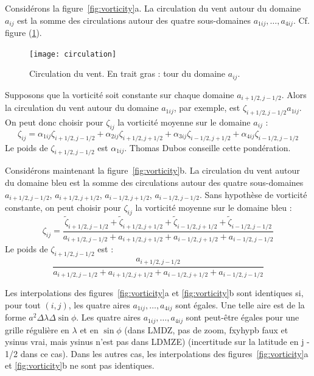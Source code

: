 \documentclass[a4paper,english,french]{article}
\begin{document}
Considérons la figure~\ref{fig:vorticity}a. La circulation du vent
autour du domaine $a_{ij}$ est la somme des circulations autour des
quatre sous-domaines $a_{1ij}, \dots, a_{4ij}$. Cf. figure
(\ref{fig:circulation}).
\begin{figure}
  \centering
  \texttt{[image: circulation]}
  \caption{Circulation du vent. En trait gras : tour du domaine
    $a_{ij}$.}
  \label{fig:circulation}
\end{figure}
Supposons que la vorticité soit constante sur chaque domaine
$a_{i+1/2, j-1/2}$. Alors la circulation du vent autour du domaine
$a_{1ij}$, par exemple, est $\zeta_{i+1/2,j-1/2} a_{1ij}$. On peut
donc choisir pour $\zeta_{ij}$ la vorticité moyenne sur le domaine
$a_{ij}$ :
\begin{equation*}
  \zeta_{ij} = \alpha_{1ij} \zeta_{i+1/2,j-1/2}
  + \alpha_{2ij} \zeta_{i+1/2,j+1/2}
  + \alpha_{3ij} \zeta_{i-1/2,j+1/2} + \alpha_{4ij} \zeta_{i-1/2,j-1/2} 
\end{equation*}
Le poids de $\zeta_{i+1/2,j-1/2}$ est $\alpha_{1ij}$. Thomas Dubos
conseille cette pondération.

Considérons maintenant la figure~\ref{fig:vorticity}b. La circulation
du vent autour du domaine bleu est la somme des circulations autour
des quatre sous-domaines $a_{i+1/2,j-1/2}$, $a_{i+1/2,j+1/2}$,
$a_{i-1/2,j+1/2}$, $a_{i-1/2,j-1/2}$. Sans hypothèse de vorticité
constante, on peut choisir pour $\zeta_{ij}$ la vorticité moyenne sur
le domaine bleu :
\begin{equation*}
  \zeta_{ij}
  = \frac{
    \tilde \zeta_{i+1/2, j-1/2} + \tilde \zeta_{i+1/2, j+1/2}
    + \tilde \zeta_{i-1/2, j+1/2} + \tilde \zeta_{i-1/2, j-1/2}
  }
  {a_{i+1/2, j-1/2} + a_{i+1/2, j+1/2} + a_{i-1/2, j+1/2} + a_{i-1/2, j-1/2}}
\end{equation*}
Le poids de $\zeta_{i+1/2,j-1/2}$ est :
\begin{equation*}
  \frac{a_{i+1/2, j-1/2}}
  {a_{i+1/2, j-1/2} + a_{i+1/2, j+1/2} + a_{i-1/2, j+1/2} + a_{i-1/2, j-1/2}}
\end{equation*}

Les interpolations des figures~\ref{fig:vorticity}a et
\ref{fig:vorticity}b sont identiques si, pour tout $(i, j)$, les
quatre aires $a_{1ij}, \dots, a_{4ij}$ sont égales. Une telle aire est
de la forme $a^2 \Delta \lambda \Delta \sin \phi$. Les quatre aires
$a_{1ij}, \dots, a_{4ij}$ sont peut-être égales pour une grille
régulière en $\lambda$ et en $\sin \phi$ (dans LMDZ, pas de zoom,
fxyhypb faux et ysinus vrai, mais ysinus n'est pas dans LDMZE)
(incertitude sur la latitude en j - 1/2 dans ce cas). Dans les autres
cas, les interpolations des figures~\ref{fig:vorticity}a et
\ref{fig:vorticity}b ne sont pas identiques.
\end{document}
